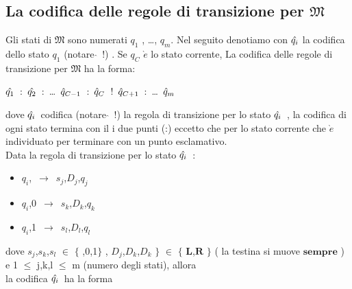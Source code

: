 \documentclass[a4paper]{article}
\theoremstyle{plain}
\theoremstyle{definition}
\begin{document}
	\subsection{La codifica delle regole di transizione per $\mathfrak{M}$ }
	\label{sec:prev-results}
	
	Gli stati di $\mathfrak{M}$ sono numerati $q_1$ , \ldots , $q_m$. Nel seguito denotiamo con 
	$\Hat{q_i}$ la codifica dello stato $q_1$ (notare $\hat{}$\ !) . Se $q_C$ $\grave{e}$ lo stato corrente, 
	La codifica delle regole di transizione per $\mathfrak{M}$ ha la forma:

	\vspace{3pt}
	\begin{center}
		$\Hat{q_1}$\ :\ $\Hat{q_2}$\ :\ \ldots\ $\Hat{q}_{C-1}$\ :\ $\Hat{q}_{C}$\ !\ $\Hat{q}_{C+1}$\ :\ \ldots\ $\Hat{q}_{m}$  
	\end{center}
	\vspace{3pt}

	dove $\Hat{q_i}$\ codifica (notare $\hat{}$\ !)  la regola di transizione per lo stato $\Hat{q_i}$\ , la codifica di ogni stato termina con il i due punti (:) 
	eccetto che per lo stato corrente che $\grave{e}$ individuato per terminare con un punto esclamativo.
	\\
	Data la regola di transizione per lo stato $\Hat{q_i}$\ :

	\vspace{3pt}
		\begin{itemize}
			\item \begin{center}
			$q_i$,\textvisiblespace\ $\rightarrow$\ $s_j$,$D_j$,$q_j$
			\end{center}
			\item \begin{center}
			$q_i$,0\ $\rightarrow$\ $s_k$,$D_k$,$q_k$
			\end{center}			
			\item  \begin{center}
			$q_i$,1\ $\rightarrow$\ $s_l$,$D_l$,$q_l$
			\end{center}	
		\end{itemize}	
	\vspace{3pt}

	dove $s_j$,$s_k$,$s_l$ $\in$ $\{$ \textvisiblespace,0,1$\}$ , $D_j$,$D_k$,$D_k$ $\}$  $\in$ $\{$ $\mathbf{L}$,$\mathbf{R}$ $\}$ ( la testina si muove $\mathbf{sempre}$ ) 
	e 1 $\leqslant$ j,k,l $\leqslant$ m (numero degli stati), allora
	\\
	la codifica $\Hat{q_i}$\  ha la forma
\end{document}
